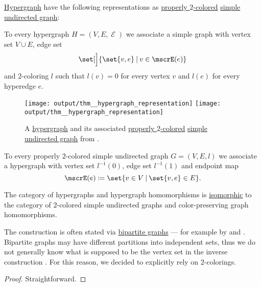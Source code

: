 \begin{proposition}\label{thm:hypergraph_representation}
  \hyperref[def:hypergraph]{Hypergraph} have the following representations as \hyperref[def:graph_coloring/proper]{properly \( 2 \)-colored} \hyperref[def:undirected_graph]{simple undirected graph}:
  \begin{thmenum}
     To every hypergraph \( H = (V, E, \mscrE) \) we associate a simple graph with vertex set \( V \cup E \), edge set
    \begin{equation*}
      \set[\Big]{ \set{ v, e } \given v \in \mscrE(e) }
    \end{equation*}
    and \( 2 \)-coloring \( l \) such that \( l(v) = 0 \) for every vertex \( v \) and \( l(e) \) for every hyperedge \( e \).

    \begin{figure}[!ht]
      \hfill
      \texttt{[image: output/thm\_\_hypergraph\_representation]}
      \hfill
      \texttt{[image: output/thm\_\_hypergraph\_representation]}
      \hfill
      \hfill
      \caption{A \hyperref[def:hypergraph]{hypergraph} and its associated \hyperref[def:graph_coloring/proper]{properly \( 2 \)-colored} \hyperref[def:undirected_graph]{simple undirected graph} from .}\label{fig:thm:hypergraph_representation}
    \end{figure}

     To every properly \( 2 \)-colored simple undirected graph \( G = (V, E, l) \) we associate a hypergraph with vertex set \( l^{-1}(0) \), edge set \( l^{-1}(1) \) and endpoint map
    \begin{equation*}
      \mscrE(e) \coloneqq \set{ v \in V \given \set{ v, e } \in E }.
    \end{equation*}

     The category of hypergraphs and hypergraph homomorphisms is \hyperref[rem:category_similarity/isomorphism]{isomorphic} to the category of \( 2 \)-colored simple undirected graphs and color-preserving graph homomorphisms.
  \end{thmenum}
\end{proposition}
\begin{comments}
  \item The construction  is often stated via \hyperref[def:multipartite_graph]{bipartite graphs} --- for example by  and . Bipartite graphs may have different partitions into independent sets, thus we do not generally know what is supposed to be the vertex set in the inverse construction . For this reason, we decided to explicitly rely on \( 2 \)-colorings.
\end{comments}
\begin{proof}
  Straightforward.
\end{proof}

